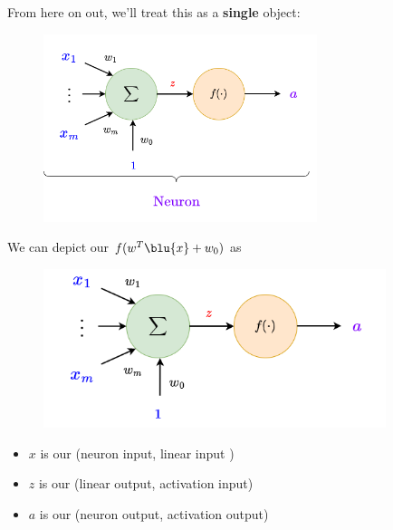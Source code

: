         From here on out, we'll treat this as a \textbf{single} object:
        
        \begin{figure}[H]
            \centering
            \includegraphics[width=80mm,scale=0.4]{images/nn_images/neuron_underbrace.png}
        \end{figure}
        
        \begin{notation}
            We can depict our  $f(w^T\blu{x}+w_0)$ as
            
            \begin{figure}[H]
                \centering
                \includegraphics[width=100mm,scale=0.4]{images/nn_images/full_neuron.png}
            \end{figure}
            
            \begin{itemize}
                \item $x$ is our  (neuron input, linear input )
                
                \item $z$ is our  (linear output, activation input)
                
                \item $a$ is our  (neuron output, activation output)
            \end{itemize}
        \end{notation}
    
